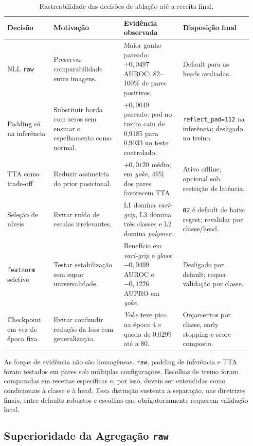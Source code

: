 \documentclass[conference]{IEEEtran}
\begin{document}
\begin{table}[htb]
\centering
\small
\caption{Rastreabilidade das decisões de ablação até a receita final.}
\label{tab:decision_trace}
\begin{tabular}{@{}p{}p{}p{}p{}@{}}
\toprule
\textbf{Decisão} & \textbf{Motivação} & \textbf{Evidência observada} & \textbf{Disposição final} \\
\midrule
NLL \texttt{raw} & Preservar comparabilidade entre imagens. & Maior ganho pareado: $+0{,}0497$ AUROC; 82--100\% de pares positivos. & Default para as heads avaliadas. \\
Padding só na inferência & Substituir borda com zeros sem ensinar o espelhamento como normal. & $+0{,}0049$ pareado; pad no treino caiu de 0{,}9185 para 0{,}9033 no teste controlado. & \texttt{reflect\_pad=112} na inferência; desligado no treino. \\
TTA como trade-off & Reduzir assimetria do prior posicional. & $+0{,}0120$ médio; em \textit{yoke}, 46\% dos pares favorecem TTA. & Ativo offline; opcional sob restrição de latência. \\
Seleção de níveis & Evitar ruído de escalas irrelevantes. & L1 domina \textit{vari-grip}, L3 domina três classes e L2 domina \textit{polymer}. & \texttt{02} é default de baixo regret; revalidar por classe/head. \\
\texttt{featnorm} seletivo & Testar estabilização sem supor universalidade. & Benefício em \textit{vari-grip} e \textit{glass}; $-0{,}0499$ AUROC e $-0{,}1226$ AUPRO em \textit{yoke}. & Desligado por default; requer validação por classe. \\
Checkpoint em vez de época fixa & Evitar confundir redução da loss com generalização. & \textit{Yoke} teve pico na época 4 e queda de 0{,}0299 até a 80. & Orçamentos por classe, early stopping e score composto. \\
\bottomrule
\end{tabular}
\end{table}

As forças de evidência não são homogêneas. \texttt{raw}, padding de inferência e TTA foram testados em pares sob múltiplas configurações. Escolhas de treino foram comparadas em receitas específicas e, por isso, devem ser entendidas como condicionais à classe e à head. Essa distinção sustenta a separação, nas diretrizes finais, entre defaults robustos e escolhas que obrigatoriamente requerem validação local.
\subsection{Superioridade da Agregação \texttt{raw}}
\label{sec:raw}
\end{document}
